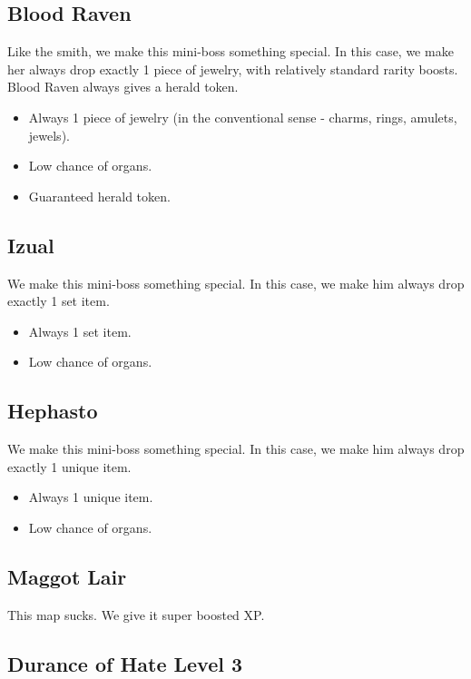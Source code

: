 \documentclass[12pt,a4paper]{article}
\begin{document}
\subsection{Blood Raven}

Like the smith, we make this mini-boss something special. In this case, we make her always drop exactly 1 piece of jewelry, with relatively standard rarity boosts. Blood Raven always gives a herald token.

\begin{itemize}
\item Always 1 piece of jewelry (in the conventional sense - charms, rings, amulets, jewels).
\item Low chance of organs.
\item Guaranteed herald token.
\end{itemize}

\subsection{Izual}

We make this mini-boss something special. In this case, we make him always drop exactly 1 set item.

\begin{itemize}
\item Always 1 set item.
\item Low chance of organs.
\end{itemize}

\subsection{Hephasto}

We make this mini-boss something special. In this case, we make him always drop exactly 1 unique item.

\begin{itemize}
\item Always 1 unique item.
\item Low chance of organs.
\end{itemize}

\subsection{Maggot Lair}

This map sucks. We give it super boosted XP.

\subsection{Durance of Hate Level 3}
\end{document}
